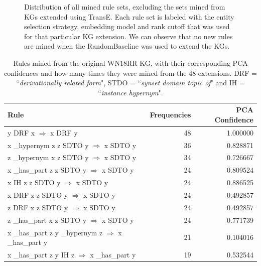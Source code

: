\begin{figure}[htbp]
\centering
    \centering
    
    \caption[Dist. of all sets of mined rules, excluding TransE.]{Distribution of all mined rule sets, excluding the sets mined from KGs extended using TransE. Each rule set is labeled with the entity selection strategy, embedding model and rank cutoff that was used for that particular KG extension. We can observe that no new rules are mined when the RandomBaseline was used to extend the KGs.}
    \label{all_sets_w_out_TransE}
\end{figure}
\iffalse
\begin{table}
\begin{tabular}{lrr}
\toprule
                                                                                                      Rule &  Frequencies &  PCA Confidence \\
\midrule
                            y  DRF  x   $\Rightarrow$ x  DRF  y &           48 &        1.000000 \\
                   x  \_hypernym  z  z  SDTO  y   $\Rightarrow$ x  SDTO  y &           36 &        0.828871 \\
                   z  \_hypernym  x  z  SDTO  y   $\Rightarrow$ x  SDTO  y &           34 &        0.726667 \\
                   x  \_has\_part  z  z  SDTO  y   $\Rightarrow$ x  SDTO  y &           24 &        0.809524 \\
          x  IH  z  z  SDTO  y   $\Rightarrow$ x  SDTO  y &           24 &        0.886525 \\
x  DRF  z  z  SDTO  y   $\Rightarrow$ x  SDTO  y &           24 &        0.492857 \\
z  DRF  x  z  SDTO  y   $\Rightarrow$ x  SDTO  y &           24 &        0.492857 \\
                   z  \_has\_part  x  z  SDTO  y   $\Rightarrow$ x  SDTO  y &           24 &        0.771739 \\
                                               x  \_has\_part  z  y  \_hypernym  z   $\Rightarrow$ x  \_has\_part  y &           21 &        0.104016 \\
                                      x  \_has\_part  z  y  IH  z   $\Rightarrow$ x  \_has\_part  y &           19 &        0.532544 \\
\bottomrule
\end{tabular}
\caption{Rules mined from the original WN18RR KG, with their corresponding PCA confidences and how many times they were mined from the 48 extensions. DRF = ``\textit{derivationally related form}", STDO = ``\textit{synset domain topic of}" and IH = ``\textit{instance hypernym}".}
\label{wn18rr_original_rules_table_frequencies}
\end{table}

